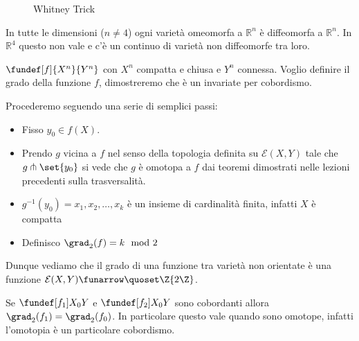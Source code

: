 \begin{figure}
    \centering %
    
    \caption{Whitney Trick}
\end{figure}

\begin{oss} %
 In tutte le dimensioni ($n \neq 4$) ogni varietà omeomorfa a $\mathbb{R}^{n}$ è diffeomorfa a  $\mathbb{R}^{n}$. In $\mathbb{R}^{4}$ questo non vale e c'è un continuo di varietà 
 non diffeomorfe tra loro.
\end{oss}

$\fundef[f]{X^{n}}{Y^{n}}$ con $X^{n}$ compatta e chiusa e $Y^{n}$ connessa. Voglio definire il grado della funzione $f$, dimostreremo che è un invariate per cobordismo.

\begin{defn}
Procederemo seguendo una serie di semplici passi:
\begin{itemize}
 \item Fisso $y_{0} \in f(X)$.
 \item Prendo $g$ vicina a $f$ nel senso della topologia definita su $\mathcal{E}(X, Y)$ tale che $g \pitchfork \set{y_{0}}$ si vede che $g$ è 
 omotopa a $f$ dai teoremi dimostrati nelle lezioni precedenti sulla trasversalità.
 \item $g^{-1}(y_{0}) = {x_{1}, x_{2}, \dots, x_{k}}$ è un insieme di cardinalità finita, infatti $X$ è compatta
 \item Definisco $\grad_{2}(f) = k \mod 2$
\end{itemize}
\end{defn}

Dunque vediamo che il grado di una funzione tra varietà non orientate è una funzione $ \mathcal{E}(X, Y) \funarrow \quoset\Z{2\Z}$.

\begin{teo}
 Se $\fundef[f_{1}]{X_{0}}{Y}$ e $\fundef[f_{2}]{X_{0}}{Y}$ sono cobordanti allora $\grad_{2}(f_{1}) = \grad_{2}(f_{0})$. In particolare questo vale quando sono omotope, infatti l'omotopia è un particolare cobordismo.\footnotemark
\end{teo}


